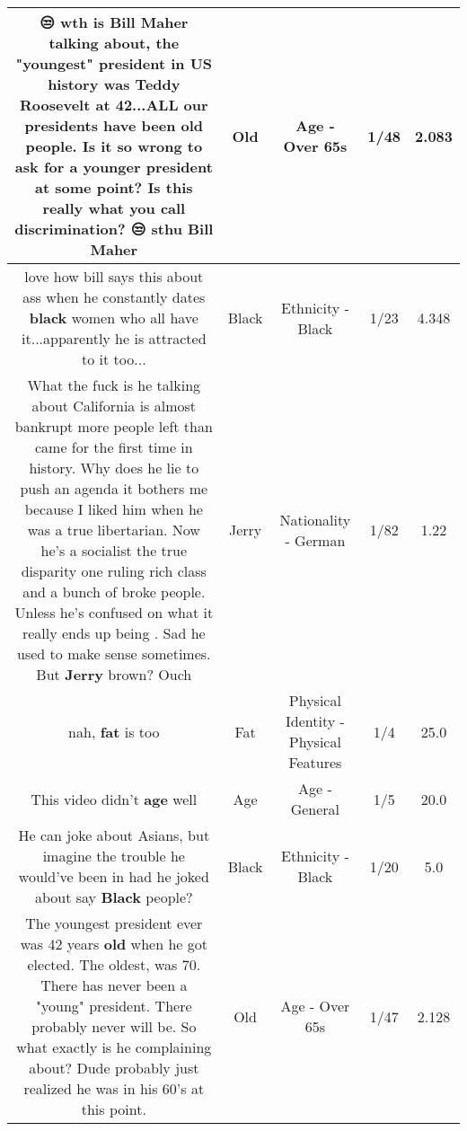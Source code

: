 \documentclass[11pt]{article}
\newlength\mylength
\begin{document}
\begin{center}
\begin{longtable}{|C{.65\mylength}|C{.30\mylength}|C{.12\mylength}|C{.12\mylength}|C{.12\mylength}|}
  \small 😒 wth is Bill Maher talking about, the "youngest" president in US history was Teddy Roosevelt at 42...ALL our presidents have been \textbf{old} people. Is it so wrong to ask for a younger president at some point? Is this really what you call discrimination? 😒 sthu Bill Maher\normalsize   & Old & Age - Over 65s & 1/48 & 2.083 \\  \hline
  \small love how bill says this about ass when he constantly dates \textbf{black} women who all have it...apparently he is attracted to it too...\normalsize   & Black & Ethnicity - Black & 1/23 & 4.348 \\  \hline
  \small What the fuck is he talking about California is almost bankrupt more people left than came for the first time in history. Why does he lie to push an agenda it bothers me because I liked him when he was a true libertarian. Now he's a socialist the true disparity  one ruling rich class and a bunch of broke people. Unless he's confused on what it really ends up being . Sad he used to make sense sometimes. But \textbf{Jerry} brown? Ouch\normalsize   & Jerry & Nationality - German & 1/82 & 1.22 \\  \hline
  \small nah, \textbf{fat} is too\normalsize   & Fat & Physical Identity - Physical Features & 1/4 & 25.0 \\  \hline
  \small This video didn't \textbf{age} well\normalsize   & Age & Age - General & 1/5 & 20.0 \\  \hline
  \small He can joke about Asians, but imagine the trouble he would've been in had he joked about say \textbf{Black} people?\normalsize   & Black & Ethnicity - Black & 1/20 & 5.0 \\  \hline
  \small The youngest president ever was 42 years \textbf{old} when he got elected. The oldest, was 70. There has never been a "young" president. There probably never will be. So what exactly is he complaining about?  Dude probably just realized he was in his 60's at this point.\normalsize   & Old & Age - Over 65s & 1/47 & 2.128 \\  \hline

\end{longtable}
\end{center}
\end{document}
